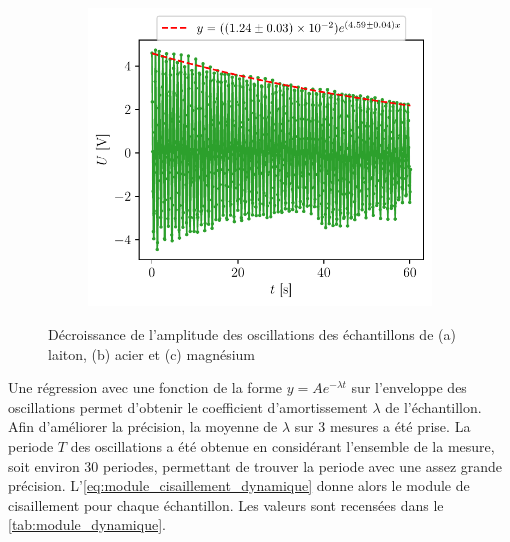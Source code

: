 \begin{figure}[H]
\begin{subfigure}{0.45\linewidth}
        \caption{}
        \label{fig:dynamique_acier}
    \end{subfigure}
    \begin{subfigure}{0.45\linewidth}
        \centering
        \includegraphics[width=\linewidth]{figures/magnesium3.pdf}
        \caption{}
        \label{fig:dynamique_magnesium}
    \end{subfigure}
    \caption{Décroissance de l'amplitude des oscillations des échantillons de (a) laiton, (b) acier et (c) magnésium}
    \label{fig:dynamique}
\end{figure}

Une régression avec une fonction de la forme $y = Ae^{-\lambda t}$ sur l'enveloppe des oscillations permet d'obtenir le coefficient d'amortissement $\lambda$ de l'échantillon. Afin d'améliorer la précision, la moyenne de $\lambda$ sur 3 mesures a été prise. La periode $T$ des oscillations a été obtenue en considérant l'ensemble de la mesure, soit environ 30 periodes, permettant de trouver la periode avec une assez grande précision. L'\autoref{eq:module_cisaillement_dynamique} donne alors le module de cisaillement pour chaque échantillon. Les valeurs sont recensées dans le \autoref{tab:module_dynamique}.

